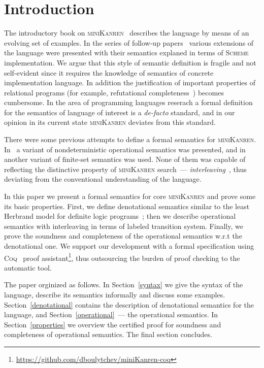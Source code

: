 \section{Introduction}

The introductory book on \textsc{miniKanren}~\cite{TRS} describes the language by means of an evolving set of examples. In the
series of follow-up papers~\cite{MicroKanren,CKanren,CKanren1,AlphaKanren,2016,Guided} various extensions of the language were presented with
their semantics explaned in terms of \textsc{Scheme} implementation. We argue that this style of semantic definition is
fragile and not self-evident since it requires the knowledge of semantics of concrete implementation language. In addition the justification of
important properties of relational programs (for example, refutational completeness~\cite{WillThesis}) becomes cumbersome. In the
area of programming languages reserach a formal definition for the semantics of language of interest is a \emph{de-facto} standard, and
in our opinion in its current state \textsc{miniKanren} deviates from this standard.

There were some previous attempts to define a formal semantics for \textsc{miniKanren}. In~\cite{RelConversion} a variant of nondeterministic
operational semantics was presented, and in~\cite{DivTest} another variant of finite-set semantics was used. None of them was capable of reflecting
the distinctive property of \textsc{miniKanren} search~--- \emph{interleaving}~\cite{Search}, thus deviating from the conventional understanding
of the language.

In this paper we present a formal semantics for core \textsc{miniKanren} and prove some its basic properties. First,
we define denotational semantics similar to the least Herbrand model for definite logic programs~\cite{LHM}; then
we describe operational semantics with interleaving in terms of labeled transition system. Finally, we prove the soundness and
completeness of the operational semantics w.r.t the denotational one. We support our development with a formal specification
using \textsc{Coq}~\cite{Coq} proof assistant\footnote{\url{https://github.com/dboulytchev/miniKanren-coq}}, thus outsourcing
the burden of proof checking to the automatic tool. 

The paper orginized as follows. In Section~\ref{syntax} we give the syntax of the language, describe its semantics
informally and discuss some examples. Section~\ref{denotational} contains the description of denotational semantics for
the language, and Section~\ref{operational}~--- the operational semantics. In Section~\ref{properties} we overview the
certified proof for soundness and completeness of operational semantics. The final section concludes.


